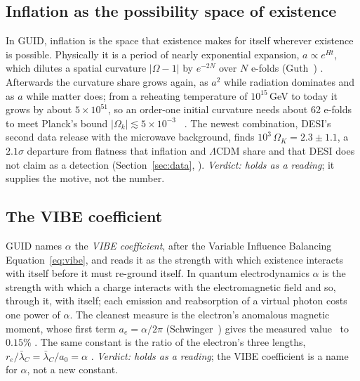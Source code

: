 \subsection{Inflation as the possibility space of existence}

In GUID, inflation is the space that existence makes for itself wherever existence is possible. Physically it is a period of nearly
exponential expansion, $a\propto e^{Ht}$, which dilutes a spatial curvature $|\Omega-1|$ by $e^{-2N}$ over $N$ e-folds (Guth~\cite{guth})
\tagP. Afterwards the curvature share grows again, as $a^2$ while radiation dominates and as $a$ while matter does; from a reheating
temperature of $10^{15}$\,GeV to today it grows by about $5\times10^{51}$, so an order-one initial curvature needs about 62 e-folds to meet
Planck's bound $|\Omega_k|\lesssim5\times10^{-3}$~\cite{planck18} . The newest combination, DESI's second data release with the
microwave background, finds $10^3\,\Omega_K=2.3\pm1.1$, a $2.1\sigma$ departure from flatness that inflation and $\Lambda$CDM share and that
DESI does not claim as a detection (Section~\ref{sec:data}, ). \emph{Verdict: holds as a reading}; it supplies the motive,
not the number.

\subsection{The VIBE coefficient}

GUID names $\alpha$ the \emph{VIBE coefficient}, after the Variable Influence Balancing Equation~\eqref{eq:vibe}, and reads it as the strength
with which existence interacts with itself before it must re-ground itself. In quantum electrodynamics $\alpha$ is the strength with which
a charge interacts with the electromagnetic field and so, through it, with itself; each emission and reabsorption of a virtual photon costs
one power of $\alpha$. The cleanest measure is the electron's anomalous magnetic moment, whose first term $a_e=\alpha/2\pi$
(Schwinger~\cite{schwinger}) gives the measured value~\cite{fan} to $0.15\%$ . The same constant is the ratio of the electron's
three lengths, $r_e/\bar\lambda_C=\bar\lambda_C/a_0=\alpha$ . \emph{Verdict: holds as a reading}; the VIBE coefficient is a name for
$\alpha$, not a new constant.

